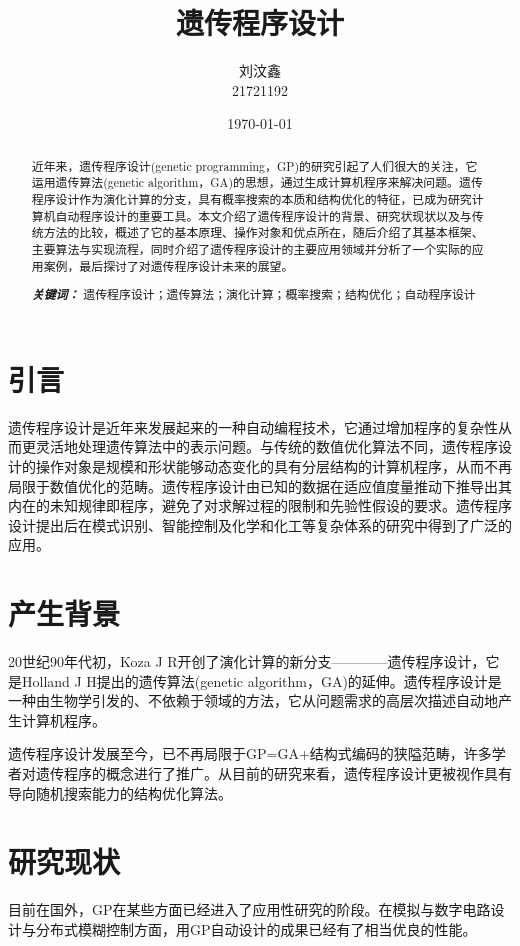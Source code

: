\documentclass[UTF8]{ctexart}
\title{\heiti 遗传程序设计}
\author{\kaishu 刘汶鑫 \\ 21721192}
\date{\today}
\providecommand{\keywords}[1]{\textbf{\textit{关键词：}} #1}
\begin{document}
\maketitle
\begin{abstract}
近年来，遗传程序设计(genetic programming，GP)的研究引起了人们很大的关注，它运用遗传算法(genetic algorithm，GA)的思想，通过生成计算机程序来解决问题。遗传程序设计作为演化计算的分支，具有概率搜索的本质和结构优化的特征，已成为研究计算机自动程序设计的重要工具。本文介绍了遗传程序设计的背景、研究状现状以及与传统方法的比较，概述了它的基本原理、操作对象和优点所在，随后介绍了其基本框架、主要算法与实现流程，同时介绍了遗传程序设计的主要应用领域并分析了一个实际的应用案例，最后探讨了对遗传程序设计未来的展望。

\keywords{遗传程序设计；遗传算法；演化计算；概率搜索；结构优化；自动程序设计}
\end{abstract}
\tableofcontents

\clearpage
\section{引言}\label{sec:intro}
遗传程序设计是近年来发展起来的一种自动编程技术，它通过增加程序的复杂性从而更灵活地处理遗传算法中的表示问题。与传统的数值优化算法不同，遗传程序设计的操作对象是规模和形状能够动态变化的具有分层结构的计算机程序，从而不再局限于数值优化的范畴。遗传程序设计由已知的数据在适应值度量推动下推导出其内在的未知规律即程序，避免了对求解过程的限制和先验性假设的要求。遗传程序设计提出后在模式识别、智能控制及化学和化工等复杂体系的研究中得到了广泛的应用。

\section{产生背景}
20世纪90年代初，Koza J R开创了演化计算的新分支————遗传程序设计，它是Holland J H提出的遗传算法(genetic algorithm，GA)的延伸。遗传程序设计是一种由生物学引发的、不依赖于领域的方法，它从问题需求的高层次描述自动地产生计算机程序。

遗传程序设计发展至今，已不再局限于GP=GA+结构式编码的狭隘范畴，许多学者对遗传程序的概念进行了推广。从目前的研究来看，遗传程序设计更被视作具有导向随机搜索能力的结构优化算法。

\section{研究现状}
目前在国外，GP在某些方面已经进入了应用性研究的阶段。在模拟与数字电路设计与分布式模糊控制方面，用GP自动设计的成果已经有了相当优良的性能。
\end{document}
